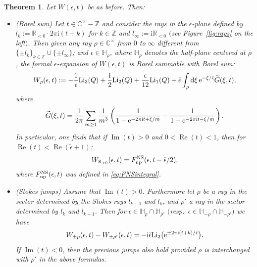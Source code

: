 \documentclass[pdftex]{sigma}
\numberwithin{equation}{section}
\newtheorem{Theorem}{Theorem}[section]
\begin{document}
\begin{Theorem}\label{maintheorem}
Let $W(\epsilon,t)$ be as before. Then:
\begin{itemize}\itemsep=0pt
 \item {\rm (Borel sum)} Let $t\in \mathbb{C}^{\times}-\mathbb{Z}$ and consider the rays in the $\epsilon$-plane defined by $l_k:=\mathbb{R}_{<0}\cdot 2\pi \mathrm{i} (t+k)$ for $k\in \mathbb{Z}$ and $l_{\infty}:=\mathrm{i}\mathbb{R}_{<0}$ $($see Figure~{\rm \ref{fig:rays}} on the left$)$. Then given any ray $\rho \in \mathbb{C}^{\times}$ from $0$ to $\infty$ different from $\{\pm l_k\}_{k\in \mathbb{Z}}\cup \{\pm l_{\infty}\}$; and $\epsilon \in \mathbb{H}_{\rho}$, where $\mathbb{H}_{\rho}$ denotes the half-plane centered at $\rho$, the formal $\epsilon$-expansion of $W(\epsilon,t)$ is Borel summable with Borel sum:
 \begin{equation*}%
 W_{\rho}(\epsilon,t) := -\frac{1}{\epsilon} \mathrm{Li}_{3}(Q)+ \frac{\mathrm{i}}{2}\mathrm{Li}_{2}(Q)+\frac{\epsilon}{12}\mathrm{Li_1}(Q) + \check{\epsilon}\int_{\rho}\mathrm{d}\xi\, {\rm e}^{-\xi/\check{\epsilon}}\widetilde{G}(\xi,t),
 \end{equation*}
 where
\begin{equation*}
 \widetilde{G}(\xi,t)=\frac{1}{2\pi}\sum_{m\geq 1}\frac{1}{m^3}\left(\frac{1}{1-{\rm e}^{-2\pi \mathrm{i} t+\xi/m}}-\frac{1}{1-{\rm e}^{-2\pi \mathrm{i} t-\xi/m}}\right).
\end{equation*}
In particular, one finds that if $\operatorname{Im}(t)>0$ and $0<\operatorname{Re}(t)<1$, then for $\operatorname{Re}(t)<\operatorname{Re}(\check\epsilon+1)$:
\begin{equation}\label{WBSR}
 W_{\mathbb{R}_{>0}}(\epsilon,t)=F_{{\rm np}}^{\rm NS}(\epsilon,t-\check\epsilon/2),
\end{equation}
where $F_{{\rm np}}^{\rm NS}(\epsilon,t)$ was defined in \eqref{eq:FNSintegral}.
\item {\rm (Stokes jumps)} Assume that $\operatorname{Im}(t)> 0$. Furthermore let $\rho$ be a ray in the sector determined by the Stokes rays $l_{k+1}$ and $l_{k}$, and $\rho'$ a ray in the sector determined by $l_{k}$ and $l_{k-1}$. Then for $\epsilon \in \mathbb{H}_{\rho}\cap \mathbb{H}_{\rho'}$ $($resp.\ $\epsilon \in \mathbb{H}_{-\rho}\cap \mathbb{H}_{-\rho'})$ we have
\begin{equation}\label{eq:StokesjumpsW}
 W_{\pm \rho}(\epsilon,t)
 -W_{\pm \rho'}(\epsilon,t) =- \mathrm{i}\check{\epsilon} \mathrm{Li}_2\big({\rm e}^{\pm 2\pi \mathrm{i}(t+k)/\check \epsilon}\big).
\end{equation}
If $\operatorname{Im}(t)<0$, then the previous jumps also hold provided $\rho$ is interchanged with $\rho'$ in the above formulas.


\end{itemize}
\end{Theorem}
\end{document}
